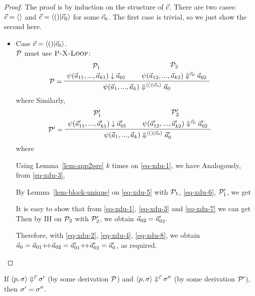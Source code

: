 \begin{proof}
	The proof is by induction on the structure of $\vec c$. There are two cases: $\vec c = \langle \rangle$ and $\c = \< () | \c_0 \'>$ for some $\vec c_0$. The first case is trivial, so we just show the second here.
	\begin{itemize}
		\item Case $\c = \< () | \c_0 \'>$. \\		
		$\mathcal{P}$ must use $\textsc{P-X-Loop}$:
		$$\PT{
			\UCN{\MP_1}{\block{\a_{11}}{\a_{k1}}{\a_{01}}}
			\UCN{\MP_2}{\sevalf{\a_{12}}{\a_{k2}}{\c_0}{\a_{02}}}
			\LeLa{\MP = }
			\BC{\sevalf{\a_1}{\a_k}{\< () | \c_0 \rangle}{\a_0}}
		}$$
		where 
		Similarly,
			$$\PT{
			\UCN{\MP'_1}{\block{\a'_{11}}{\a'_{k1}}{\a'_{01}}}
			\UCN{\MP'_2}{\sevalf{\a'_{12}}{\a'_{k2}}{\c_0}{\a'_{02}}}
			\LeLa{\MP' = }
			\BC{\sevalf{\a_1}{\a_k}{\< () | \c_0 \rangle}{\a'_0}}
		}$$
		where
		
		Using Lemma~\ref{lem-app2pre} $k$ times on \eqref{eq-xdu-1}, we have 
		Analogously, from  \eqref{eq-xdu-3},
		
		By Lemma~\ref{lem-block-unique} on \eqref{eq-xdu-5} with
		$\mathcal{P}_1$, \eqref{eq-xdu-6}, $\mathcal{P}_1'$, we get
		
		It is easy to show that from \eqref{eq-xdu-1}, \eqref{eq-xdu-3} and \eqref{eq-xdu-7} we can get
		Then by IH on $\mathcal{P}_2$ with $\mathcal{P}_2'$, we obtain $\vec a_{02} = \vec a'_{02}.$
		
		Therefore, with \eqref{eq-xdu-2}, \eqref{eq-xdu-4}, \eqref{eq-xdu-8}, 
		we obtain $\a_0 = \a_{01} {\++} \a_{02} = \a'_{01} {\++} \a'_{02} = \a'_0$, as required.
	\end{itemize}
	
	 
\end{proof}


\begin{thm} \label{thm-svcode-determ}
	If $\left\langle p,\sigma \right\rangle \Downarrow^{\vec c} \sigma'$ (by some derivation $\mathcal{P}$) and $\left\langle p,\sigma \right\rangle \Downarrow^{\vec c} \sigma''$ (by some derivation $\mathcal{P}'$), 
	then $\sigma' = \sigma''$.
\end{thm}

